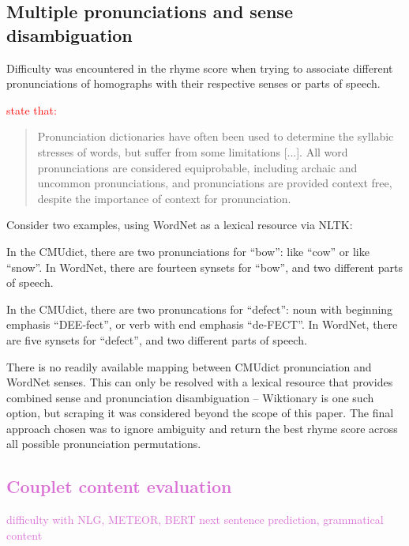 \documentclass[11pt,a4paper]{article}
\newenvironment{tight_enumerate}{
\begin{enumerate}
\setlength{\itemsep}{0pt}
\setlength{\parskip}{0pt}
}{\end{enumerate}}
\begin{document}
\subsection{Multiple pronunciations and sense disambiguation}
\label{sec:synset}

Difficulty was encountered in the rhyme score when trying to associate different pronunciations of homographs with their respective senses or parts of speech. \textcolor{red}{\citet{hopkins-kiela-2017} state that:
\begin{quote}
Pronunciation dictionaries have often been used to determine the syllabic stresses of words, but suffer from some limitations [...]. All word pronunciations are considered equiprobable, including archaic and uncommon pronunciations, and pronunciations are provided context free, despite the importance of context for pronunciation.
\end{quote}}

Consider two examples, using WordNet \cite{wordnet} as a lexical resource via NLTK:
\begin{tight_enumerate}
	\vspace{-0.5em}
	\item
		In the CMUdict, there are two pronunciations for ``bow'': like ``cow'' or like ``snow''. In WordNet, there are fourteen synsets for ``bow'', and two different parts of speech.
	\item
		In the CMUdict, there are two pronuncations for ``defect'': noun with beginning emphasis ``DEE-fect'', or verb with end emphasis ``de-FECT''. In WordNet, there are five synsets for ``defect'', and two different parts of speech.
\end{tight_enumerate}

There is no readily available mapping between CMUdict pronunciation and WordNet senses. This can only be resolved with a lexical resource that provides combined sense and pronunciation disambiguation -- Wiktionary \cite{wiktionary} is one such option, but scraping it was considered beyond the scope of this paper. The final approach chosen was to ignore ambiguity and return the best rhyme score across all possible pronunciation permutations.

\textcolor{Orchid}{
\subsection{Couplet content evaluation}
\label{sec:nlg}
difficulty with NLG, METEOR, BERT next sentence prediction, grammatical content
}
\end{document}
